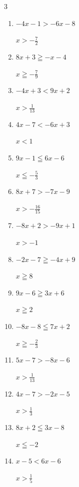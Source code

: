 \begin{multicols}{3}
\begin{enumerate}
  \item $-4x-1>-6x-8$

        $\displaystyle x>-\frac{7}{2}$

  \item $8x+3\geqq -x-4$

        $\displaystyle x\geqq -\frac{7}{9}$

  \item $-4x+3<9x+2$

        $\displaystyle x>\frac{1}{13}$

  \item $4x-7<-6x+3$

        $\displaystyle x<1$

  \item $9x-1\leqq 6x-6$

        $\displaystyle x\leqq -\frac{5}{3}$

  \item $8x+7>-7x-9$

        $\displaystyle x>-\frac{16}{15}$

  \item $-8x+2>-9x+1$

        $\displaystyle x>-1$

  \item $-2x-7\geqq -4x+9$

        $\displaystyle x\geqq 8$

  \item $9x-6\geqq 3x+6$

        $\displaystyle x\geqq 2$

  \item $-8x-8\leqq 7x+2$

        $\displaystyle x\geqq -\frac{2}{3}$

  \item $5x-7>-8x-6$

        $\displaystyle x>\frac{1}{13}$

  \item $4x-7>-2x-5$

        $\displaystyle x>\frac{1}{3}$

  \item $8x+2\leqq 3x-8$

        $\displaystyle x\leqq -2$

\columnbreak %

\resetques

  \item $x-5<6x-6$

        $\displaystyle x>\frac{1}{5}$


\end{enumerate}
\end{multicols}
